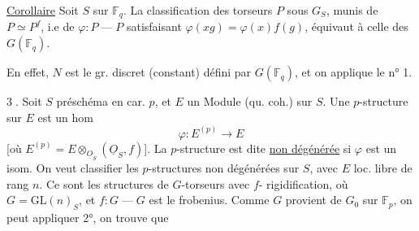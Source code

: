 \uline{Corollaire} Soit $S$ sur $\mathbb F_q$. La classification des
torseurs $P$ sous $G_S$, munis de $P\simeq P^f$, i.e
de $\varphi:P\mathbin{\text{---}}P$ satisfaisant $\varphi(xg)=\varphi(x)f(g)$, équivaut
à celle des 
$G(\mathbb F_q)$.

En effet, $N$ est le gr. discret  (constant)
défini par $G(\mathbb F_q)$, et on applique le n° 1.

\textcircled{3}. Soit $S$ préschéma en car. $p$, et $E$ un
Module (qu. coh.) sur $S$. Une $p$-structure sur $E$
est un hom
\[
\varphi:E^{(p)}\longrightarrow E
\]
[où $E^{(p)}=E\otimes_{\underline O_S}(\underline O_S,f)$]. La $p$-structure est
dite \uline{non dégénérée} si $\varphi$ est un isom.
On veut classifier les $p$-structures non
dégénérées sur $S$, avec $E$ loc. libre de rang $n$.
Ce sont les structures de $G$-torseurs avec $f$-
rigidification, où $G=\mathrm{GL}(n)_S$, et $f:G\mathbin{\text{---}}G$
est le frobenius. Comme $G$ provient de
$G_0$ sur $\mathbb F_p$, on peut appliquer 2°, on trouve que
